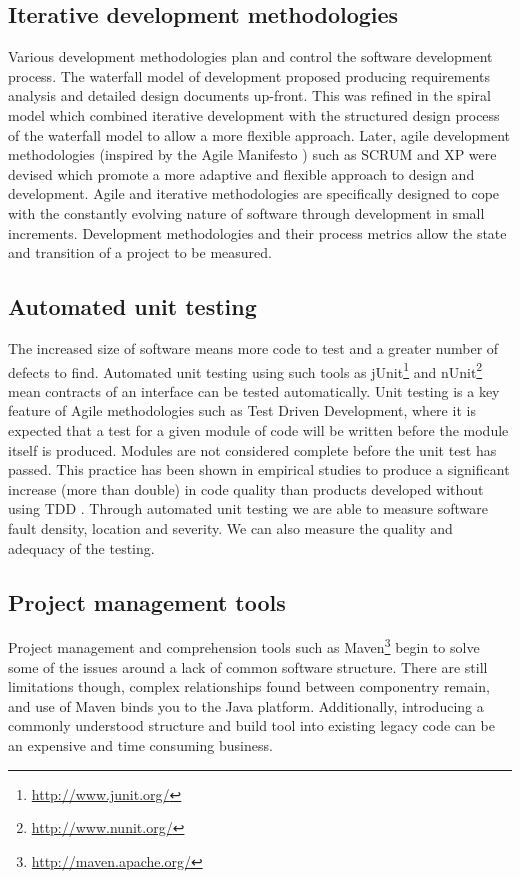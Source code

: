\subsection{Iterative development methodologies}

Various development methodologies plan and control the software development process. The waterfall model of development proposed producing requirements analysis and detailed design documents up-front. This was refined in the spiral model which combined iterative development with the structured design process of the waterfall model to allow a more flexible approach. Later, agile development methodologies (inspired by the Agile Manifesto \citep{beck01}) such as SCRUM and XP were devised which promote a more adaptive and flexible approach to design and development. Agile and iterative methodologies are specifically designed to cope with the constantly evolving nature of software through development in small increments. Development methodologies and their process metrics allow the state and transition of a project to be measured.  

\subsection{Automated unit testing}

The increased size of software means more code to test and a greater number of defects to find. Automated unit testing using such tools as jUnit\footnote{\url{http://www.junit.org/}} and nUnit\footnote{\url{http://www.nunit.org/}} mean contracts of an interface can be tested automatically. Unit testing is a key feature of Agile methodologies such as Test Driven Development, where it is expected that a test for a given module of code will be written before the module itself is produced. Modules are not considered complete before the unit test has passed. This practice has been shown in empirical studies to produce a significant increase (more than double) in code quality than products developed without using TDD \citep{bhat06}. Through automated unit testing we are able to measure software fault density, location and severity. We can also measure the quality and adequacy of the testing.

\subsection{Project management tools}
Project management and comprehension tools such as Maven\footnote{\url{http://maven.apache.org/}} begin to solve some of the issues around a lack of common software structure. There are still limitations though, complex relationships found between componentry remain, and use of Maven binds you to the Java platform. Additionally, introducing a commonly understood structure and build tool into existing legacy code can be an expensive and time consuming business.  


